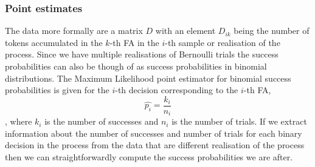 \subsubsection{Point estimates}
The data more formally are a matrix $D$ with an element $D_{ik}$ being
the number of tokens accumulated in the $k$-th FA in the $i$-th
sample or realisation of the process. Since we have multiple
realisations of Bernoulli trials the success probabilities can also be
though of as success probabilities in binomial distributions. The
Maximum Likelihood point estimator for binomial success probabilities
is given for the $i$-th decision corresponding to the $i$-th FA,
\begin{equation*}
\hat{p_i} = \frac{k_i}{n_i}
\end{equation*}
, where $k_i$ is the number of successes and $n_i$ is the number of
trials. If we extract information about the number of successes and
number of trials for each binary decision in the process from the data
that are different realisation of the process then we can
straightforwardly compute the success probabilities we are after.

